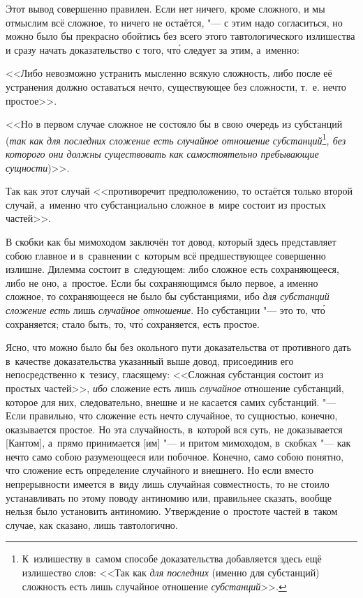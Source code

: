 Этот вывод совершенно правилен. Если нет ничего, кроме сложного, и мы
отмыслим всё сложное, то ничего не остаётся, "--- с этим надо согласиться, но
можно было бы прекрасно обойтись без всего этого тавтологического излишества
и сразу начать доказательство с того, чт\'{о} следует за этим, а~именно:

<<Либо невозможно устранить мысленно всякую сложность, либо после её устранения
должно оставаться нечто, существующее без сложности, т.~е. нечто простое>>.

<<Но в первом случае сложное не состояло бы в свою очередь из субстанций
({\em так как для последних сложение есть случайное
отношение субстанций}\footnote{К~излишеству в~самом способе
доказательства добавляется здесь ещё излишество слов: <<Так как
{\em для последних} (именно для субстанций) сложность есть лишь случайное
отношение {\em субстанций}>>.}{\em , без которого они должны
существовать как самостоятельно пребывающие сущности})>>.

Так как этот случай <<противоречит предположению, то остаётся
только второй случай, а~именно что субстанциально
сложное в~мире состоит из простых частей>>.

В скобки как бы мимоходом заключён тот довод, который здесь представляет
собою главное и в~сравнении с~которым всё предшествующее совершенно излишне.
Дилемма состоит в~следующем: либо сложное есть сохраняющееся, либо не оно,
а~простое. Если бы сохраняющимся было первое, а именно сложное,
то сохраняющееся не было бы субстанциями, ибо {\em для субстанций
сложение есть} лишь {\em случайное отношение}. Но субстанции "--- это то,
чт\'{о} сохраняется; стало быть, то, чт\'{о} сохраняется, есть простое.

Ясно, что можно было бы без окольного пути доказательства от противного дать
в~качестве доказательства указанный выше довод, присоединив его
непосредственно к~тезису, гласящему: <<Сложная субстанция состоит из простых
частей>>, {\em ибо} сложение есть лишь {\em случайное} отношение субстанций,
которое для них, следовательно, внешне и не касается самих субстанций. "---
Если правильно, что сложение есть нечто случайное, то сущностью, конечно,
оказывается простое. Но эта случайность, в~которой вся суть, не доказывается
[Кантом], а~прямо принимается [им] "--- и притом мимоходом, в~скобках "--- как
нечто само собою разумеющееся или побочное. Конечно, само собою понятно, что
сложение есть определение случайного и внешнего. Но если вместо непрерывности
имеется в~виду лишь случайная совместность, то не стоило устанавливать
по этому поводу антиномию или, правильнее сказать, вообще нельзя было
установить антиномию. Утверждение о~простоте частей в~таком случае,
как сказано, лишь тавтологично.

